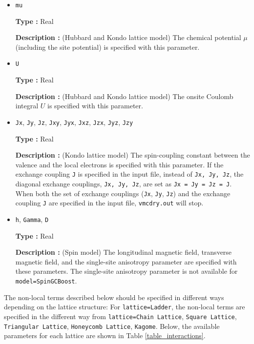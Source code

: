 \begin{itemize}

\item \verb|mu|

{\bf Type :} Real

{\bf Description :} (Hubbard and Kondo lattice model) 
The chemical potential $\mu$ (including the site potential)
is specified with this parameter.

\item \verb|U|

{\bf Type :} Real

{\bf Description :} (Hubbard and Kondo lattice model) 
The onsite Coulomb integral $U$ is specified with this parameter.

\item \verb|Jx|, \verb|Jy|, \verb|Jz|, \verb|Jxy|, 
  \verb|Jyx|, \verb|Jxz|, \verb|Jzx|, \verb|Jyz|, \verb|Jzy|

{\bf Type :} Real

{\bf Description :} (Kondo lattice model) 
The spin-coupling constant between the valence and the local electrons
is specified with this parameter.
If the exchange coupling \verb|J| is specified in the input file,
instead of \verb|Jx, Jy, Jz|,
the diagonal exchange couplings, \verb|Jx, Jy, Jz|, are set as \verb|Jx = Jy = Jz = J|.
When both
the set of exchange couplings (\verb|Jx|, \verb|Jy|, \verb|Jz|)
and the exchange coupling \verb|J| are specified in the input file,
\verb|vmcdry.out| will stop.

\item \verb|h|, \verb|Gamma|, \verb|D|

{\bf Type :} Real

{\bf Description :} (Spin model)
The longitudinal magnetic field, transverse magnetic field, 
and the single-site anisotropy parameter are specified with these parameters.
The single-site anisotropy parameter is not available for \verb|model=SpinGCBoost|.

\end{itemize}

The non-local terms described below should be specified
in different ways depending on the lattice structure:
For \verb|lattice=Ladder|, the non-local terms are specified in the different way
from \verb|lattice=Chain Lattice|, \verb|Square Lattice|, \verb|Triangular Lattice|, \verb|Honeycomb Lattice|, \verb|Kagome|. 
Below, the available parameters for each lattice are shown in
Table \ref{table_interactions}.


